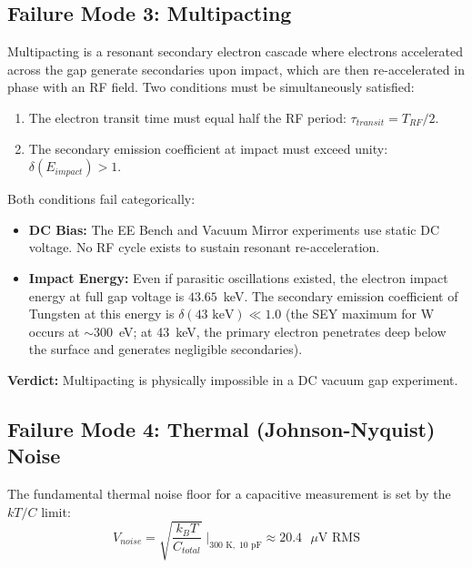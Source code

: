 \subsection{Failure Mode 3: Multipacting}

Multipacting is a resonant secondary electron cascade where electrons accelerated across the gap generate secondaries upon impact, which are then re-accelerated in phase with an RF field. Two conditions must be simultaneously satisfied:
\begin{enumerate}
    \item The electron transit time must equal half the RF period: $\tau_{transit} = T_{RF}/2$.
    \item The secondary emission coefficient at impact must exceed unity: $\delta(E_{impact}) > 1$.
\end{enumerate}

Both conditions fail categorically:
\begin{itemize}
    \item \textbf{DC Bias:} The EE Bench and Vacuum Mirror experiments use static DC voltage. No RF cycle exists to sustain resonant re-acceleration.
    \item \textbf{Impact Energy:} Even if parasitic oscillations existed, the electron impact energy at full gap voltage is $43.65$~keV. The secondary emission coefficient of Tungsten at this energy is $\delta(43\text{ keV}) \ll 1.0$ (the SEY maximum for W occurs at $\sim 300$~eV; at 43~keV, the primary electron penetrates deep below the surface and generates negligible secondaries).
\end{itemize}

\textbf{Verdict:} Multipacting is physically impossible in a DC vacuum gap experiment.

\subsection{Failure Mode 4: Thermal (Johnson-Nyquist) Noise}

The fundamental thermal noise floor for a capacitive measurement is set by the $kT/C$ limit:
\begin{equation}
    V_{noise} = \sqrt{\frac{k_B T}{C_{total}}} \;\bigg|_{300\text{ K},\; 10\text{ pF}} \approx 20.4\text{ $\mu$V RMS}
\end{equation}

